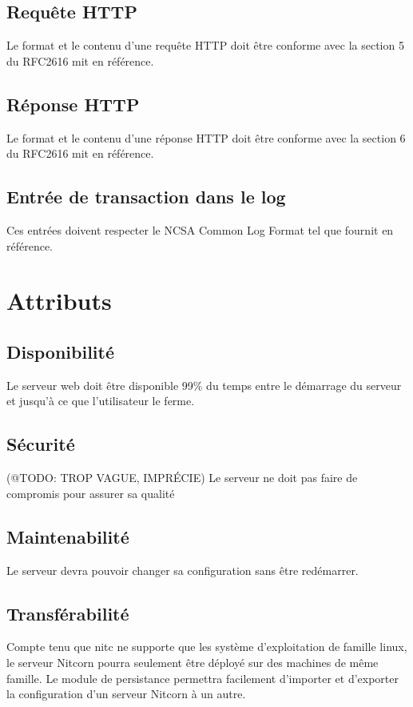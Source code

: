 \documentclass{scrreprt}
\begin{document}
\subsection{Requête HTTP}
Le format et le contenu d'une requête HTTP doit être conforme avec la section 5 du RFC2616\cite{http1.0} mit en référence.
\subsection{Réponse HTTP}
Le format et le contenu d'une réponse HTTP doit être conforme avec la section 6 du RFC2616\cite{http1.0} mit en référence.
\subsection{Entrée de transaction dans le log}
Ces entrées doivent respecter le NCSA Common Log Format\cite{NCSA} tel que fournit en référence.



\section{Attributs}
\subsection{Disponibilité}
Le serveur web doit être disponible 99\% du temps entre le démarrage du serveur et jusqu'à ce que l'utilisateur le ferme.
\subsection{Sécurité}
(@TODO: TROP VAGUE, IMPRÉCIE)
Le serveur ne doit pas faire de compromis pour assurer sa qualité
\subsection{Maintenabilité}
Le serveur devra pouvoir changer sa configuration sans être redémarrer.
\subsection{Transférabilité} 
Compte tenu que nitc ne supporte que les système d'exploitation de famille linux, le serveur Nitcorn pourra seulement être déployé
sur des machines de même famille. 
Le module de persistance permettra facilement d'importer et d'exporter la configuration d'un serveur Nitcorn à un autre.
\end{document}
